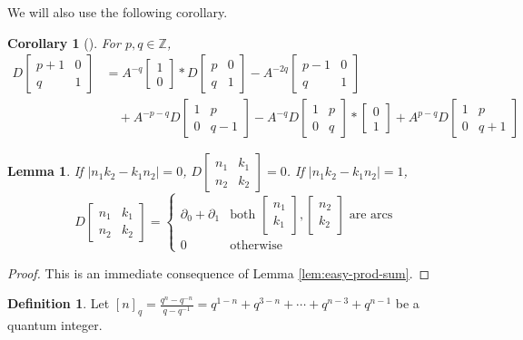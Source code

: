 \documentclass{article}
\newcommand{\del}{\partial}
\newcommand{\Z}{\mathbb{Z}}
\newcommand{\fourmat}[4]{\begin{bmatrix}#1&#2\\#3&#4\end{bmatrix}}
\newcommand{\lilmat}[4]{\left[\begin{smallmatrix}#1&#2\\#3&#4\end{smallmatrix}\right]}
\newcommand{\twos}[2]{\left[\begin{smallmatrix}#1\\#2\end{smallmatrix}\right]}
\newcommand{\two}[2]{\begin{bmatrix}#1\\#2\end{bmatrix}}
\newtheorem{lemma}[theorem]{Lemma}
\newtheorem{corollary}[theorem]{Corollary}
\theoremstyle{definition}
\newtheorem{definition}[theorem]{Definition}
\begin{document}
We will also use the following corollary.
\begin{corollary}[]\label{cor:sikiwang-3.3}
    For $p,q\in \Z$,
    \begin{align*}
        D\begin{bmatrix}
        p+1&0\\
        q&1
    \end{bmatrix}
    &=A^{-q}\two{1}{0}*D\begin{bmatrix}
        p&0\\
        q&1
    \end{bmatrix}-A^{-2q}\begin{bmatrix}
        p-1&0\\
        q&1
    \end{bmatrix}\\
    &\quad +A^{-p-q}D\begin{bmatrix}
        1&p\\
        0&q-1
    \end{bmatrix}-A^{-q}D\begin{bmatrix}
        1&p\\
        0&q
    \end{bmatrix}*\two{0}{1}+A^{p-q}D\begin{bmatrix}
        1&p\\
        0&q+1
    \end{bmatrix}
    \end{align*}
\end{corollary}

\begin{lemma}\label{lem:easy-discrep}
    If $|n_1k_2-k_1n_2|=0$, $D\fourmat{n_1}{k_1}{n_2}{k_2}=0$. If $|n_1k_2-k_1n_2|=1$,
    \[
    D\lilmat{n_1}{k_1}{n_2}{k_2}=\begin{cases}
        \del_0+\del_1&\text{both }\twos{n_1}{k_1},\twos{n_2}{k_2}\text{ are arcs}\\
        0&\text{otherwise}
    \end{cases}
    \]
\end{lemma}
\begin{proof}
    This is an immediate consequence of Lemma \ref{lem:easy-prod-sum}.
\end{proof}

\begin{definition}
    Let $[n]_q=\frac{q^{n}-q^{-n}}{q-q^{-1}}=q^{1-n}+q^{3-n}+\cdots+q^{n-3} +q^{n-1}$ be a quantum integer.
\end{definition}
\end{document}
